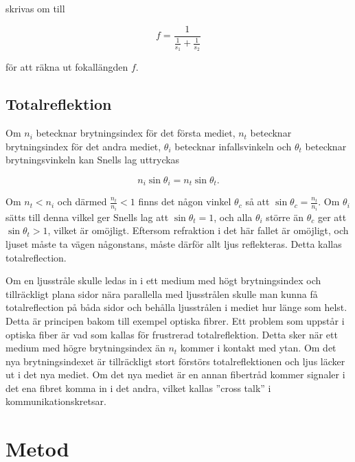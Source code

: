 \documentclass[a4paper]{article}
\begin{document}
  skrivas om till
  
  \begin{equation}
	  f = \frac{1}{\frac{1}{s_1} + \frac{1}{s_2}}\label{eq:foklength}
  \end{equation}
  
  för att räkna ut fokallängden $f$.

\subsection{Totalreflektion}

	Om $n_i$ betecknar brytningsindex för det första mediet, $n_t$ betecknar brytningsindex för det andra mediet, $\theta_i$ betecknar infallsvinkeln och $\theta_t$ betecknar brytningsvinkeln kan Snells lag uttryckas \cite[pp.~21--22]{pearsonIntroOpt}
	
	\begin{equation} \label{eq:snell}
		n_i\sin\theta_i = n_t\sin\theta_t\text{.}
	\end{equation}
	
	Om $n_t < n_i$ och därmed $\frac{n_t}{n_i} < 1$ finns det någon vinkel $\theta_c$ så att $\sin\theta_c = \frac{n_t}{n_i}$. Om $\theta_i$ sätts till denna vilkel ger Snells lag att $\sin\theta_t = 1$, och alla $\theta_i$ större än $\theta_c$ ger att $\sin\theta_t > 1$, vilket är omöjligt. Eftersom refraktion i det här fallet är omöjligt, och ljuset måste ta vägen någonstans, måste därför allt ljus reflekteras. Detta kallas totalreflection.
	
	Om en ljusstråle skulle ledas in i ett medium med högt brytningsindex och tillräckligt plana sidor nära parallella med ljusstrålen skulle man kunna få totalreflection på båda sidor och behålla ljusstrålen i mediet hur länge som helst. Detta är principen bakom till exempel optiska fibrer. Ett problem som uppstår i optiska fiber är vad som kallas för frustrerad totalreflektion. Detta sker när ett medium med högre brytningsindex än $n_t$ kommer i kontakt med ytan. Om det nya brytningsindexet är tillräckligt stort förstörs totalreflektionen och ljus läcker ut i det nya mediet. Om det nya mediet är en annan fibertråd kommer signaler i det ena fibret komma in i det andra, vilket kallas ”cross talk” i kommunikationskretsar.
	\cite[pp.~261--263]{pearsonIntroOpt}

\section{Metod}
  
\end{document}
